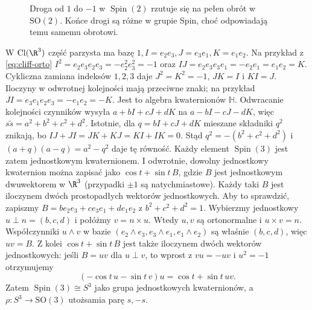 \begin{figure}[!htbp]
\centering
{}
\caption{Droga od $1$ do $-1$ w $\operatorname{Spin}(2)$
rzutuje się na pełen obrót w $\mathrm{SO}(2)$.
Końce drogi są różne w grupie Spin, choć odpowiadają
temu samemu obrotowi.}
\label{fig:spin-dwukrotne}
\end{figure}

\begin{przyklad}
\label{prz:spin3}
W $\operatorname{Cl}(\R^3)$ część parzysta ma bazę
$1,I=e_2e_3,J=e_3e_1,K=e_1e_2$.
Na przykład z \eqref{eq:cliff-orto}
$I^2=e_2e_3e_2e_3=-e_2^2e_3^2=-1$ oraz
$IJ=e_2e_3e_3e_1=-e_2e_1=e_1e_2=K$.
Cykliczna zamiana indeksów $1,2,3$ daje
$J^2=K^2=-1$, $JK=I$ i $KI=J$.
Iloczyny w odwrotnej kolejności mają przeciwne znaki;
na przykład $JI=e_3e_1e_2e_3=-e_1e_2=-K$.
Jest to algebra kwaternionów $\mathbb H$.
Odwracanie kolejności czynników wysyła
$a+bI+cJ+dK$ na $a-bI-cJ-dK$,
więc $s\widetilde s=a^2+b^2+c^2+d^2$.
Istotnie, dla $q=bI+cJ+dK$ mieszane składniki $q^2$
znikają, bo $IJ+JI=JK+KJ=KI+IK=0$.
Stąd $q^2=-(b^2+c^2+d^2)$ i
$(a+q)(a-q)=a^2-q^2$ daje tę równość.
Każdy element $\operatorname{Spin}(3)$
jest zatem jednostkowym kwaternionem.
I odwrotnie, dowolny jednostkowy kwaternion
można zapisać jako $\cos t+\sin t\,B$,
gdzie $B$ jest jednostkowym dwuwektorem
w $\R^3$ (przypadki $\pm1$ są natychmiastowe).
Każdy taki $B$ jest iloczynem dwóch
prostopadłych wektorów jednostkowych. Aby to sprawdzić,
zapiszmy $B=b e_2e_3+c e_3e_1+d e_1e_2$ z $b^2+c^2+d^2=1$.
Wybierzmy jednostkowy $u\perp n=(b,c,d)$ i połóżmy
$v=n\times u$. Wtedy $u,v$ są ortonormalne i $u\times v=n$.
Współczynniki $u\wedge v$ w bazie
$(e_2\wedge e_3,e_3\wedge e_1,e_1\wedge e_2)$ są właśnie $(b,c,d)$,
więc $uv=B$. Z kolei
$\cos t+\sin t\,B$ jest także iloczynem dwóch
wektorów jednostkowych: jeśli $B=uv$ dla
$u\perp v$, to wprost z $vu=-uv$ i $u^2=-1$
otrzymujemy
\[
 (-\cos t\,u-\sin t\,v)u
     =\cos t+\sin t\,uv.
\]
Zatem $\operatorname{Spin}(3)\cong S^3$
jako grupa jednostkowych kwaternionów,
a $\rho:S^3\to\mathrm{SO}(3)$ utożsamia
parę $s,-s$.
\end{przyklad}

